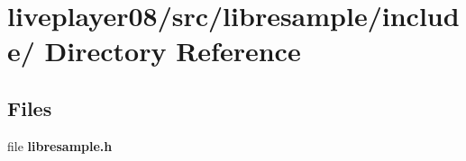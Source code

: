 \section{liveplayer08/src/libresample/include/ Directory Reference}
\label{dir_a0e0135aa2a104ea86f0a03f0378fa49}
\subsection*{Files}
\begin{CompactItemize}
\item 
file {\bf libresample.h}
\end{CompactItemize}
